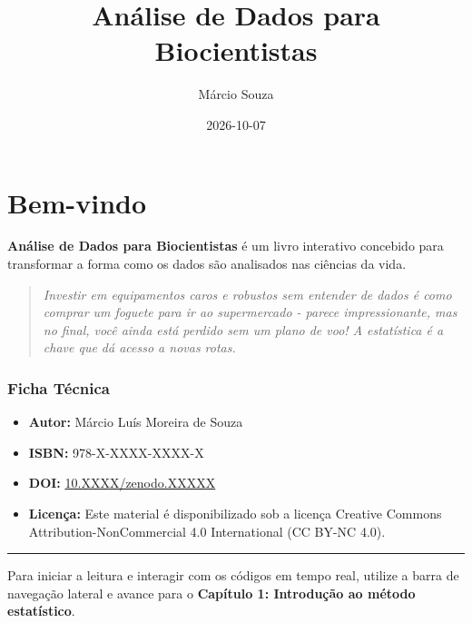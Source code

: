 \documentclass[
  brazilian,
  letterpaper,
  DIV=11,
  numbers=noendperiod]{scrreprt}
\title{Análise de Dados para Biocientistas}
\author{Márcio Souza}
\date{2026-10-07}
\providecommand{\tightlist}{%
  \setlength{\itemsep}{0pt}\setlength{\parskip}{0pt}}
\renewcommand*\contentsname{Índice}
\newcommand\contentsname{Índice}
\begin{document}
\maketitle

\renewcommand*\contentsname{Índice}
{
\hypersetup{linkcolor=}
\setcounter{tocdepth}{2}
\tableofcontents
}


\chapter*{Bem-vindo}\label{bem-vindo}


\textbf{Análise de Dados para Biocientistas} é um livro interativo
concebido para transformar a forma como os dados são analisados nas
ciências da vida.

\begin{quote}
\emph{Investir em equipamentos caros e robustos sem entender de dados é
como comprar um foguete para ir ao supermercado - parece impressionante,
mas no final, você ainda está perdido sem um plano de voo! A estatística
é a chave que dá acesso a novas rotas.}
\end{quote}

\subsection*{Ficha Técnica}\label{ficha-tuxe9cnica}

\begin{itemize}
\tightlist
\item
  \textbf{Autor:} Márcio Luís Moreira de Souza
\item
  \textbf{ISBN:} 978-X-XXXX-XXXX-X
\item
  \textbf{DOI:}
  \href{https://doi.org/10.XXXX/zenodo.XXXXX}{10.XXXX/zenodo.XXXXX}
\item
  \textbf{Licença:} Este material é disponibilizado sob a licença
  Creative Commons Attribution-NonCommercial 4.0 International (CC BY-NC
  4.0).
\end{itemize}

\begin{center}\rule{0.5\linewidth}{0.5pt}\end{center}

Para iniciar a leitura e interagir com os códigos em tempo real, utilize
a barra de navegação lateral e avance para o \textbf{Capítulo 1:
Introdução ao método estatístico}.
\end{document}
